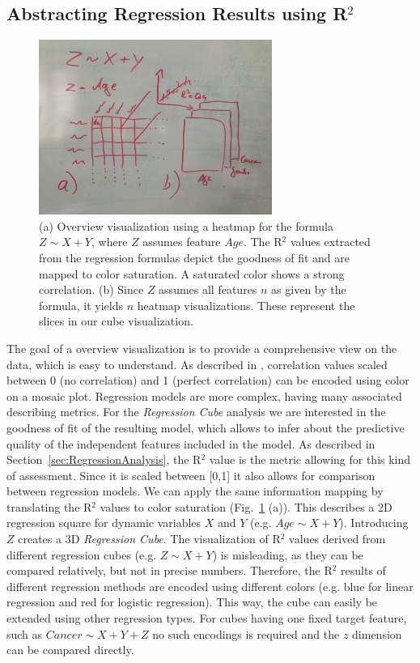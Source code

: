 \documentclass[journal]{style/vgtc} 			          %
\begin{document}
\subsection{Abstracting Regression Results using R$^2$}
\begin{figure}[htb]
 \centering
 \includegraphics[width=3.0in]{figures/cube_sketch}
 \caption{
 (a) Overview visualization using a heatmap for the formula $Z \sim X + Y$, where $Z$ assumes feature $Age$.
 The R$^2$ values extracted from the regression formulas depict the goodness of fit and are mapped to color saturation.
 A saturated color shows a strong correlation.
 (b) Since $Z$ assumes all features $n$ as given by the formula, it yields $n$ heatmap visualizations.
 These represent the slices in our cube visualization.
 }
  \label{fig:Cube}
\end{figure}
The goal of a overview visualization is to provide a comprehensive view on the data, which is easy to understand.
As described in \cite{Klemm2014VIS}, correlation values scaled between 0 (no correlation) and 1 (perfect correlation) can be encoded using color on a mosaic plot.
Regression models are more complex, having many associated describing metrics.
For the \emph{Regression Cube} analysis we are interested in the goodness of fit of the resulting model, which allows to infer about the predictive quality of the independent features included in the model.
As described in Section~\ref{sec:RegressionAnalysis}, the R$^2$ value is the metric allowing for this kind of assessment.
Since it is scaled between [0,1] it also allows for comparison between regression models.
We can apply the same information mapping by translating the R$^2$ values to color saturation (Fig.~\ref{fig:Cube} (a)).
This describes a 2D regression square for dynamic variables $X$ and $Y$ (e.g. $Age \sim X + Y$).
Introducing $Z$ creates a 3D \emph{Regression Cube}.
The visualization of R$^2$ values derived from different regression cubes (e.g. $Z \sim X + Y$) is misleading, as they can be compared relatively, but not in precise numbers.
Therefore, the R$^2$ results of different regression methods are encoded using different colors (e.g. blue for linear regression and red for logistic regression).
This way, the cube can easily be extended using other regression types.
For cubes having one fixed target feature, such as $Cancer \sim X + Y + Z$ no such encodings is required and the $z$ dimension can be compared directly.
\end{document}
